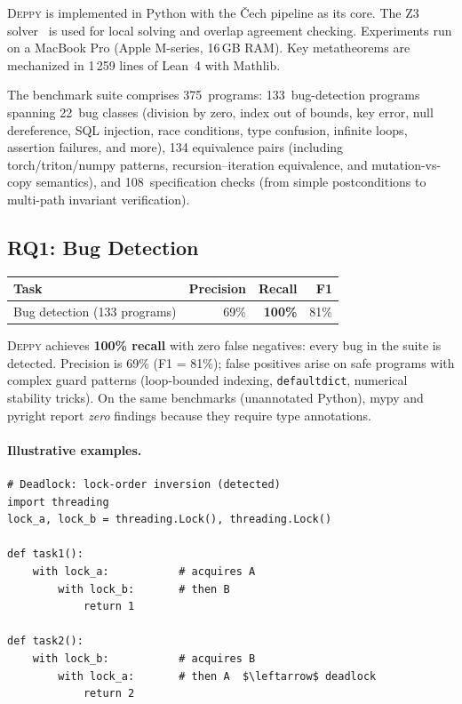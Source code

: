 \documentclass[acmsmall,screen]{acmart}
\theoremstyle{remark}
\newcommand{\py}[1]{\lstinline[language=Python]{#1}}
\begin{document}
\textsc{Deppy} is implemented in Python with the \v{C}ech pipeline
as its core.  The Z3 solver~\cite{deMouraBjorner08} is used for
local solving and overlap agreement checking.  Experiments run on
a MacBook Pro (Apple M-series, 16\,GB RAM).  Key metatheorems are
mechanized in 1\,259 lines of Lean~4 with Mathlib.

The benchmark suite comprises 375~programs: 133~bug-detection programs
spanning 22~bug classes (division by zero, index out of bounds, key
error, null dereference, SQL injection, race conditions, type
confusion, infinite loops, assertion failures, and more), 134
equivalence pairs (including torch/triton/numpy patterns, recursion--iteration
equivalence, and mutation-vs-copy semantics), and 108~specification
checks (from simple postconditions to multi-path invariant verification).

\subsection{RQ1: Bug Detection}\label{sec:rq1}

\begin{center}\small
\begin{tabular}{lrrr}
\toprule
\textbf{Task} & \textbf{Precision} & \textbf{Recall} & \textbf{F1} \\
\midrule
Bug detection (133 programs) & 69\% & \textbf{100\%} & 81\% \\
\bottomrule
\end{tabular}
\end{center}

\textsc{Deppy} achieves \textbf{100\% recall} with zero false
negatives: every bug in the suite is detected.  Precision is 69\%
(F1 = 81\%); false positives arise on safe programs with complex guard
patterns (loop-bounded indexing, \py{defaultdict}, numerical stability
tricks).  On the same benchmarks (unannotated Python), mypy and pyright
report \emph{zero} findings because they require type annotations.

\paragraph{Illustrative examples.}

\begin{lstlisting}
# Deadlock: lock-order inversion (detected)
import threading
lock_a, lock_b = threading.Lock(), threading.Lock()

def task1():
    with lock_a:           # acquires A
        with lock_b:       # then B
            return 1

def task2():
    with lock_b:           # acquires B
        with lock_a:       # then A  $\leftarrow$ deadlock
            return 2
\end{lstlisting}
\end{document}
